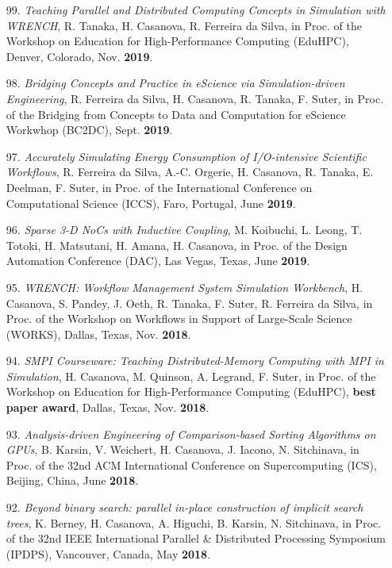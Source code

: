 \begin{enumerate}

\item [99.] {\it Teaching Parallel and Distributed Computing Concepts in
Simulation with WRENCH}, R. Tanaka, H. Casanova, R. Ferreira da Silva, in
Proc. of the Workshop on Education for High-Performance Computing (EduHPC),
Denver, Colorado, Nov. {\bf 2019}.


\item [98.] {\it Bridging Concepts and Practice in eScience via
      Simulation-driven Engineering},
    R. Ferreira da Silva, H. Casanova, R. Tanaka, F. Suter,
	in Proc. of the Bridging from Concepts to Data and Computation for
	eScience Workwhop (BC2DC), Sept. {\bf 2019}.

\item [97.] {\it Accurately Simulating Energy Consumption of I/O-intensive Scientific Workflows}, R. Ferreira da Silva, A.-C. Orgerie, H. Casanova, R. Tanaka, E. Deelman, F. Suter, in Proc. of the International Conference on Computational Science (ICCS), Faro, Portugal, June {\bf 2019}.

\item [96.] {\it Sparse 3-D NoCs with Inductive Coupling}, M. Koibuchi, L. Leong, T. Totoki, H. Matsutani, H. Amana, H. Casanova, in Proc. of the Design Automation Conference (DAC), Las Vegas, Texas, June {\bf 2019}.

\item [95.] {\it WRENCH: Workflow Management System Simulation Workbench}, H. Casanova, S. Pandey, J. Oeth, R. Tanaka, F. Suter, R. Ferreira da Silva, in Proc. of the Workshop on Workflows in Support of Large-Scale Science (WORKS), Dallas, Texas, Nov. {\bf 2018}.

\item [94.] {\it SMPI Courseware: Teaching Distributed-Memory Computing with MPI in Simulation}, H. Casanova, M. Quinson, A. Legrand, F. Suter, in Proc. of the Workshop on Education for High-Performance Computing (EduHPC), {\bf best paper award}, Dallas, Texas, Nov. {\bf 2018}.

\item [93.] {\it Analysis-driven Engineering of Comparison-based Sorting
    Algorithms on GPUs},
    B. Karsin, V. Weichert, H. Casanova, J. Iacono, N. Sitchinava, 
in Proc. of the 32nd ACM International Conference on Supercomputing
(ICS), Beijing, China, June {\bf 2018}.

\item [92.] {\it Beyond binary search: parallel in-place construction of implicit search trees},
K. Berney, H. Casanova, A. Higuchi, B. Karsin, N. Sitchinava,
in Proc. of the 32nd IEEE International Parallel \& Distributed Processing Symposium (IPDPS), Vancouver, Canada, May {\bf 2018}.



\end{enumerate}
